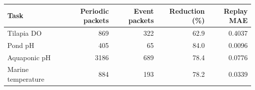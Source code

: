 \begin{tabular}{lrrrr}
\toprule
Task & Periodic packets & Event packets & Reduction (\%) & Replay MAE \\
\midrule
Tilapia DO & 869 & 322 & 62.9 & 0.4037 \\
Pond pH & 405 & 65 & 84.0 & 0.0096 \\
Aquaponic pH & 3186 & 689 & 78.4 & 0.0776 \\
Marine temperature & 884 & 193 & 78.2 & 0.0339 \\
\bottomrule
\end{tabular}